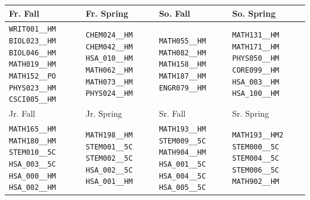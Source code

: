 \begin{tabular}{|p{}|p{}|p{}|p{}|}
    \hline
    Fr. Fall & Fr. Spring & So. Fall & So. Spring\\\hline
    \verb|WRIT001__HM| \verb|BIOL023__HM| \verb|BIOL046__HM| \verb|MATH019__HM| \verb|MATH152__PO| \verb|PHYS023__HM| \verb|CSCI005__HM|&
    \verb|CHEM024__HM| \verb|CHEM042__HM| \verb|HSA_010__HM| \verb|MATH062__HM| \verb|MATH073__HM| \verb|PHYS024__HM|&
    \verb|MATH055__HM| \verb|MATH082__HM| \verb|MATH158__HM| \verb|MATH187__HM| \verb|ENGR079__HM|&
    \verb|MATH131__HM| \verb|MATH171__HM| \verb|PHYS050__HM| \verb|CORE099__HM| \verb|HSA_003__HM| \verb|HSA_100__HM|\\
    \hline
    Jr. Fall & Jr. Spring & Sr. Fall & Sr. Spring\\\hline
    \verb|MATH165__HM| \verb|MATH180__HM| \verb|STEM010__5C| \verb|HSA_003__5C| \verb|HSA_000__HM| \verb|HSA_002__HM|&
    \verb|MATH198__HM| \verb|STEM001__5C| \verb|STEM002__5C| \verb|HSA_002__5C| \verb|HSA_001__HM|&
    \verb|MATH193__HM| \verb|STEM009__5C| \verb|MATH904__HM| \verb|HSA_001__5C| \verb|HSA_004__5C| \verb|HSA_005__5C|&
    \verb|MATH193__HM2| \verb|STEM000__5C| \verb|STEM004__5C| \verb|STEM006__5C| \verb|MATH902__HM|\\
    \hline
\end{tabular}